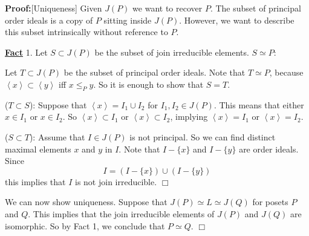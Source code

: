 \documentclass[11pt]{article}
\newenvironment{proof}{\noindent \textbf{Proof:}}{$\Box$}
\newcommand{\Bf}[1]{\textbf{#1}}
\newcommand{\brak}[1]{\left\langle #1 \right\rangle}
\begin{document}
\begin{proof}[Uniqueness]
Given $J(P)$ we want to recover $P$. The subset of principal order ideals is a copy of $P$ sitting inside $J(P)$. However, we want to describe this subset intrinsically without reference to $P$.

\underline{\Bf{Fact}} 1. Let $S \subset J(P)$ be the subset of join irreducible elements. $S \simeq P$:

Let $T \subset J(P)$ be the subset of principal order ideals. Note that $T \simeq P$, because $\brak{x} \subset \brak{y}$ iff $x \leq_P y$. So it is enough to show that $S=T$.

($T \subset S$): Suppose that $\brak{x}=I_1 \cup I_2$ for $I_1,I_2 \in J(P)$. This means that either $x \in I_1$ or $x \in I_2$. So $\brak{x} \subset I_1$ or $\brak{x} \subset I_2$, implying $\brak{x}=I_1$ or $\brak{x}=I_2$.

($S \subset T$): Assume that $I \in J(P)$ is not principal. So we can find distinct maximal elements $x$ and $y$ in $I$. Note that $I - \{x\}$ and $I - \{y\}$ are order ideals. Since $$I=(I - \{x\}) \cup (I - \{y\})$$ this implies that $I$ is not join irreducible. \hfill \scriptsize $\Box$ \normalsize

We can now show uniqueness. Suppose that $J(P) \simeq L \simeq J(Q)$ for posets $P$ and $Q$. This implies that the join irreducible elements of $J(P)$ and $J(Q)$ are isomorphic. So by Fact 1, we conclude that $P \simeq Q$.
\end{proof}
\end{document}

